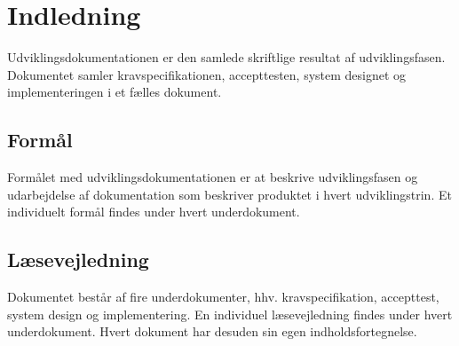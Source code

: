 \chapter*{Indledning}
Udviklingsdokumentationen er den samlede skriftlige resultat af udviklingsfasen. Dokumentet samler kravspecifikationen, accepttesten, system designet og implementeringen i et fælles dokument. 

\section*{Formål}
Formålet med udviklingsdokumentationen er at beskrive udviklingsfasen og udarbejdelse af dokumentation som beskriver produktet i hvert udviklingstrin. Et individuelt formål findes under hvert underdokument. 

\section*{Læsevejledning}
Dokumentet består af fire underdokumenter, hhv. kravspecifikation, accepttest, system design og implementering. En individuel læsevejledning findes under hvert underdokument. Hvert dokument har desuden sin egen indholdsfortegnelse. 